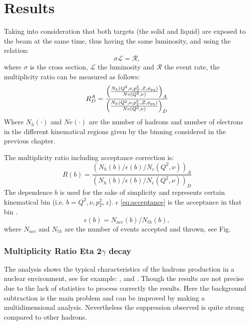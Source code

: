 \chapter{Results}
\label{ch:results}
Taking into consideration that both targets (the solid and liquid) are exposed to the beam at the same time, thus having the same luminosity, and using the relation:
\begin{equation}
\sigma\mathcal{L} = \mathcal{R},
\end{equation}
where $\sigma$ is the cross section, $\mathcal{L}$ the luminosity and $\mathcal{R}$ the event rate, the multiplicity ratio can be measured as follows:
\begin{equation}
R_D^A=\frac{\left( \frac{N_h(Q^2,\nu,p_T^2,Z,\phi_{pq})}{Ne(Q^2,\nu)} \right)_A}{\left( \frac{N_h(Q^2,\nu,p_T^2,Z,\phi_{pq})}{Ne(Q^2,\nu)} \right)_D}
\end{equation}
Where $N_h(\cdot)$ and $Ne(\cdot)$ are the number of hadrons and number of electrons in the different kinematical regions given by the binning considered in the previous chapter.

The multiplicity ratio including acceptance correction is:
\begin{equation}
R(b) = \frac{\left(N_h(b)/\epsilon(b)/N_e(Q^2,\nu)\right)_A}{\left(N_h(b)/\epsilon(b)/N_e(Q^2,\nu)\right)_D}
\label{eq:MR_AC}
\end{equation}
The dependence $b$ is used for the sake of simplicity and represents certain kinematical bin (i.e. $b = Q^2,\nu,p_T^2, z $). $\epsilon$ \eqref{eq:acceptance} is the acceptance in that bin .
%
\begin{equation}
\epsilon(b) = N_{acc}(b)/N_{th}(b),
\label{eq:acceptance}
\end{equation} 
where $N_{acc}$  and $N_{th}$ are the number of events accepted and thrown, see Fig. %
%
\subsection{Multiplicity Ratio Eta 2$\gamma$ decay}
The analysis shows the typical characteristics of the hadrons production in a nuclear environment, see for example: \cite{Hermes_2007},\cite{Hermes_2011} and \cite{Hermes_2013}. Though the results are not precise due to the lack of statistics to process correctly the results. Here the background subtraction is the main problem and can be improved by making a multidimensional analysis. Nevertheless the suppression observed is quite strong compared to other hadrons.

